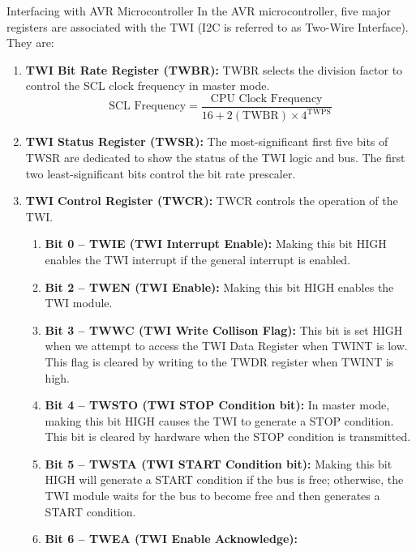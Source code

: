 \documentclass[11pt]{beamer}
\begin{document}
\begin{frame}{Interfacing with AVR Microcontroller}
        \noindent%
        In the AVR microcontroller, five major registers are associated with the TWI (I2C is referred to as Two-Wire
        Interface). They are: \\
        \begin{enumerate}
            \item \textbf{TWI Bit Rate Register (TWBR):}
            TWBR selects the division factor to control the SCL clock frequency in master mode.
            \\
            \begin{equation*}
                \text{SCL Frequency} = \frac{\text{CPU Clock Frequency}}{16 + 2 (\text{TWBR}) \times 4^{\text{TWPS}}}
            \end{equation*}
            \item \textbf{TWI Status Register (TWSR):}
            The most-significant first five bits of TWSR are dedicated to show the status of the TWI logic and bus. The
            first two least-significant bits control the bit rate prescaler.
            \item \textbf{TWI Control Register (TWCR):} TWCR controls the operation of the TWI.
            \begin{enumerate}
                \item \textbf{Bit 0 -- TWIE (TWI Interrupt Enable):}
                Making this bit HIGH enables the TWI interrupt if the general interrupt is enabled.
                \item \textbf{Bit 2 -- TWEN (TWI Enable):} Making this bit HIGH enables the TWI module.
                \item \textbf{Bit 3 -- TWWC (TWI Write Collison Flag):}
                This bit is set HIGH when we attempt to access the TWI Data Register when TWINT is low. This flag is
                cleared by writing to the TWDR register when TWINT is high.
                \item \textbf{Bit 4 -- TWSTO (TWI STOP Condition bit):}
                In master mode, making this bit HIGH causes the TWI to generate a STOP condition. This bit is cleared by
                hardware when the STOP condition is transmitted.
                \item \textbf{Bit 5 -- TWSTA (TWI START Condition bit):}
                Making this bit HIGH will generate a START condition if the bus is free; otherwise, the TWI module waits
                for the bus to become free and then generates a START condition.
                \item \textbf{Bit 6 -- TWEA (TWI Enable Acknowledge):}

\end{enumerate}
\end{enumerate}
\end{frame}
\end{document}

